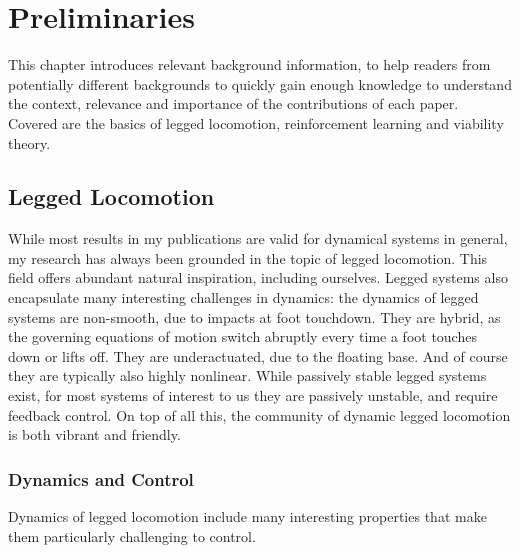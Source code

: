 
\chapter{Preliminaries} \label{chap:prelims}
This chapter introduces relevant background information, to help readers from potentially different backgrounds to quickly gain enough knowledge to understand the context, relevance and importance of the contributions of each paper. Covered are the basics of legged locomotion, reinforcement learning and viability theory.

\section{Legged Locomotion}

While most results in my publications are valid for dynamical systems in general, my research has always been grounded in the topic of legged locomotion. This field offers abundant natural inspiration, including ourselves. Legged systems also encapsulate many interesting challenges in dynamics: the dynamics of legged systems are non-smooth, due to impacts at foot touchdown. They are hybrid, as the governing equations of motion switch abruptly every time a foot touches down or lifts off. They are underactuated, due to the floating base. And of course they are typically also highly nonlinear. While passively stable legged systems exist, for most systems of interest to us they are passively unstable, and require feedback control.
On top of all this, the community of dynamic legged locomotion is both vibrant and friendly.

\subsection{Dynamics and Control}
Dynamics of legged locomotion include many interesting properties that make them particularly challenging to control.  \par

